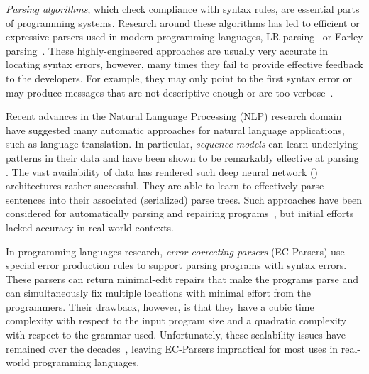 \emph{Parsing algorithms}, which check compliance with syntax rules, are
essential parts of programming systems. Research around these algorithms
has led to 
efficient or expressive parsers used in modern programming languages, \eg 
LR parsing~\citep{Aho1974} or Earley parsing~\citep{Earley_1970}. These highly-engineered
approaches are usually very accurate in locating syntax errors, however, many
times they fail to provide effective feedback to the developers. For example, they may only
point to the first syntax error or may produce messages that are not descriptive enough
or are too verbose~\citep{Kummerfeld2003, Ahadi_2018,
VanDerSpek_2005}. 
% 

Recent advances in the Natural Language Processing (NLP) research domain
\citep{Sutskever_2014, Hardalov_2018} have suggested many automatic approaches
for natural language applications, such as language translation. In
particular, \emph{sequence models} can learn underlying
patterns in their data and have been shown to be remarkably
effective at parsing \citep{Vinyals2015}. The vast availability of data has
rendered such deep neural network (\dnn) architectures rather successful. They
are able to learn to effectively parse sentences into their associated
(serialized) parse trees. Such approaches have been considered for
automatically parsing and repairing programs~\citep{Ahmed_2021}, but 
initial efforts lacked accuracy in real-world contexts. 

In programming languages research, \emph{error
correcting parsers} (EC-Parsers) \citep{Aho_1972} use special error production
rules to support parsing programs with syntax errors. These parsers can return
minimal-edit repairs that make the programs parse and can simultaneously fix
multiple locations with minimal effort from the programmers. Their drawback,
however, is that they have a cubic time complexity with respect to the
input program size and a quadratic complexity with respect to the grammar
used. 
% 
Unfortunately, these scalability issues have remained over the
decades~\citep{McLean1996, Rajasekaran2014}, leaving EC-Parsers
impractical for most uses in real-world programming languages.

